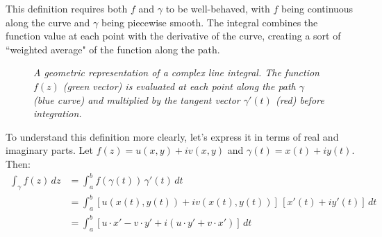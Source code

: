 \noindent This definition requires both $f$ and $\gamma$ to be well-behaved, with $f$ being continuous along the curve and $\gamma$ being piecewise smooth. The integral combines the function value at each point with the derivative of the curve, creating a sort of ``weighted average" of the function along the path. \\

\begin{figure}[H]
\centering
{}
\caption{\textit{A geometric representation of a complex line integral. The function $f(z)$ (green vector) is evaluated at each point along the path $\gamma$ (blue curve) and multiplied by the tangent vector $\gamma'(t)$ (red) before integration.}}
\label{fig:complex-line-integral}
\end{figure}

\noindent To understand this definition more clearly, let's express it in terms of real and imaginary parts. Let $f(z) = u(x,y) + iv(x,y)$ and $\gamma(t) = x(t) + iy(t)$. Then:
\begin{align*}
\int_{\gamma} f(z) \, dz &= \int_a^b f(\gamma(t)) \, \gamma'(t) \, dt \\
&= \int_a^b [u(x(t),y(t)) + iv(x(t),y(t))] \, [x'(t) + iy'(t)] \, dt \\
&= \int_a^b [u \cdot x' - v \cdot y' + i(u \cdot y' + v \cdot x')] \, dt \\
\end{align*}


